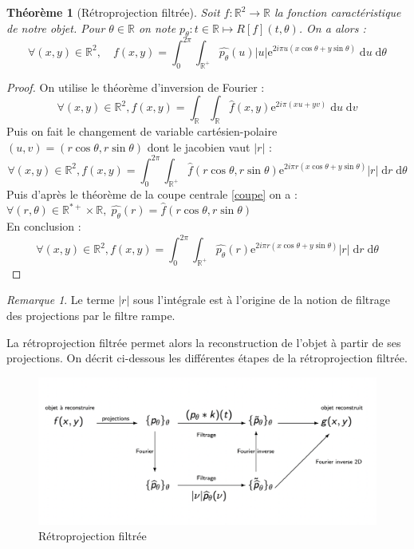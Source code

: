 \documentclass{article}
\newcommand*{\R}{\mathbb{R}}
\newcommand*{\dd}[1]{\mathrm{d}#1}
\theoremstyle{definition}
\theoremstyle{remark}
\newtheorem{remarque}{Remarque}
\theoremstyle{plain}
\newtheorem{theorem}{Théorème}
\theoremstyle{definition}
\begin{document}
\begin{theorem}[Rétroprojection filtrée]
    Soit $f : \R^2 \longrightarrow \R$ la fonction caractéristique de notre objet. Pour $\theta \in \R$ on note $p_{\theta} : t \in \R \longmapsto R[f](t,\theta)$. On a alors : 
    $$\forall (x,y) \in \R^2, \quad f(x,y) = \int_{0}^{2\pi}\int_{\R^+} \widehat{p_{\theta}}(u) \lvert u \rvert \mathrm{e}^{2i \pi u (x \cos \theta + y \sin \theta)} \; \dd u \; \dd \theta$$
\end{theorem}
\begin{proof}
On utilise le théorème d'inversion de Fourier : $$\forall (x,y) \in \R^2, f(x,y) = \int_{\R}\int_{\R} \widehat{f}(x,y)\mathrm{e}^{2i \pi (xu + yv)} \; \dd u \; \dd v$$
Puis on fait le changement de variable cartésien-polaire $(u,v) = (r \cos \theta, r \sin \theta)$ dont le jacobien vaut $\lvert r \rvert $ : 
$$\forall (x,y) \in \R^2, f(x,y) = \int_{0}^{2\pi}\int_{\R^+} \widehat{f}(r\cos \theta,r \sin \theta)\mathrm{e}^{2i \pi r(x\cos \theta + y \sin \theta)}\lvert r \rvert \; \dd r \; \dd \theta$$
Puis d'après le théorème de la coupe centrale \ref{coupe} on a : $\forall (r,\theta) \in \R^{*+} \times \R, \; \widehat{p_{\theta}}(r)= \widehat{f}(r \cos \theta, r \sin \theta)$\\
En conclusion : $$\forall (x,y) \in \R^2, f(x,y) = \int_{0}^{2\pi}\int_{\R^+} \widehat{p_{\theta}}(r)\mathrm{e}^{2i \pi r(x\cos \theta + y \sin \theta)} \lvert r \rvert \; \dd r \; \dd \theta$$
\end{proof}
\begin{remarque}
    Le terme $\lvert r \rvert$ sous l'intégrale est à l'origine de la notion de filtrage des projections par le filtre rampe.
\end{remarque}
La rétroprojection filtrée permet alors la reconstruction de l'objet à partir de ses projections. On décrit ci-dessous les différentes étapes de la rétroprojection filtrée. 
\begin{figure}[h]
    \centering
    \includegraphics[scale = 0.6]{reconstrucfilterred.png}
    \caption{Rétroprojection filtrée}
\end{figure}
\newpage
\end{document}
